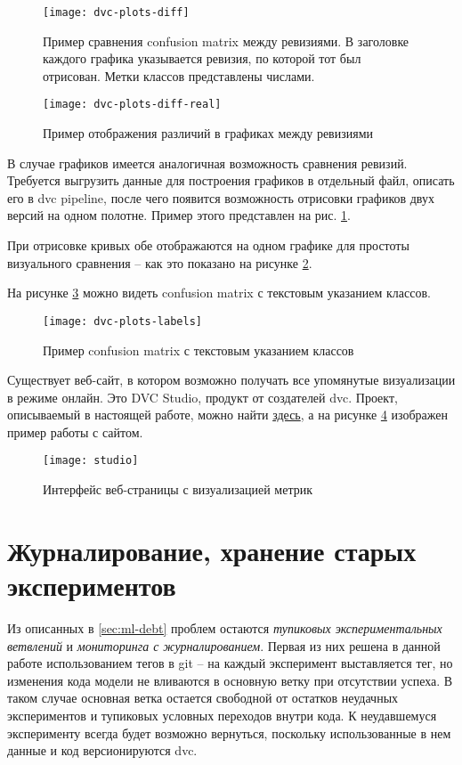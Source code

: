 \begin{figure}[!h]
    \centering
    \texttt{[image: dvc-plots-diff]}
    \caption{Пример сравнения confusion matrix между ревизиями. В заголовке каждого графика указывается ревизия, по которой тот был отрисован. Метки классов представлены числами.}
    \label{fig:dvc-plots-diff}
\end{figure}
\begin{figure}[!ht]
    \centering
    \texttt{[image: dvc-plots-diff-real]}
    \caption{Пример отображения различий в графиках между ревизиями}
    \label{fig:dvc-plots-diff-real}
\end{figure}
В случае графиков имеется аналогичная возможность сравнения ревизий.
Требуется выгрузить данные для построения графиков в отдельный файл, описать его в \gls{dvc} \gls{pipeline}, после чего появится возможность отрисовки графиков двух версий на одном полотне.
Пример этого представлен на рис. \ref{fig:dvc-plots-diff}.

При отрисовке кривых обе отображаются на одном графике для простоты визуального сравнения -- как это показано на рисунке \ref{fig:dvc-plots-diff-real}.

На рисунке \ref{fig:dvc-plots-labels} можно видеть confusion matrix с текстовым указанием классов.
\begin{figure}[!ht]
    \texttt{[image: dvc-plots-labels]}
    \caption{Пример confusion matrix с текстовым указанием классов}
    \label{fig:dvc-plots-labels}
\end{figure}

Существует веб-сайт, в котором возможно получать все упомянутые визуализации в режиме онлайн.
Это DVC Studio, продукт от создателей \gls{dvc}.
Проект, описываемый в настоящей работе, можно найти \href{https://studio.iterative.ai/user/alekseik1/views/dataclassification-crawler-e1vtfsj7dv}{здесь}, а на рисунке \ref{fig:studio} изображен пример работы с сайтом.

\begin{figure}[!h]
    \centering
    \texttt{[image: studio]}
    \caption{Интерфейс веб-страницы с визуализацией метрик}
    \label{fig:studio}
\end{figure}
\section{Журналирование, хранение старых экспериментов}
Из описанных в \ref{sec:ml-debt} проблем остаются \textit{тупиковых экспериментальных ветвлений} и \textit{мониторинга с журналированием}.
Первая из них решена в данной работе использованием тегов в \gls{git} -- на каждый эксперимент выставляется тег, но изменения кода модели не вливаются в основную ветку при отсутствии успеха.
В таком случае основная ветка остается свободной от остатков неудачных экспериментов и тупиковых условных переходов внутри кода.
К неудавшемуся эксперименту всегда будет возможно вернуться, поскольку использованные в нем данные и код версионируются \gls{dvc}.

